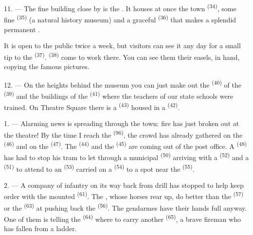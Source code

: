 \VUsaut{4.0mm}
\VUsaut{3.4mm}

11. --- The fine building close by is the . It houses at once the town
 \textsuperscript{(34)}, some fine
 \textsuperscript{(35)} (a natural history
museum) and a graceful  \textsuperscript{(36)} that makes a splendid
permanent .

It is open to the public twice a week, but visitors can see it any day for a small tip to the
 \textsuperscript{(37)}.  \textsuperscript{(38)} come to
work there. You can see them  their easels,  in hand,
copying the famous pictures.

12. --- On the heights behind the museum you can just make out the
 \textsuperscript{(40)} of the  \textsuperscript{(39)} and the
buildings of the  \textsuperscript{(41)} where the teachers
of our state schools were trained. On Theatre Square there is a
 \textsuperscript{(43)} housed in a 
\textsuperscript{(42)}.

\VUsaut{5.0mm}
\VUsaut{3.0mm}

\VUsaut{3.4mm}

1. --- Alarming news is spreading through the town: fire has just broken out at the theatre!
By the time I reach the  \textsuperscript{(96)}, the crowd has already gathered
on the  \textsuperscript{(46)} and on the
 \textsuperscript{(47)}. The  \textsuperscript{(44)} and the
 \textsuperscript{(45)} are coming out of the post office. A
 \textsuperscript{(48)} has had to stop his tram to let through a
municipal  \textsuperscript{(50)} arriving with a 
\textsuperscript{(52)} and a  \textsuperscript{(51)} to attend to an
 \textsuperscript{(53)} carried on a 
\textsuperscript{(54)} to a spot near the  \textsuperscript{(55)}.

2. --- A company of infantry on its way back from drill has stopped to help keep order with
the mounted  \textsuperscript{(61)}. The
, whose horses rear up, do better than the 
\textsuperscript{(57)} or the  \textsuperscript{(63)} at pushing back the
 \textsuperscript{(56)}. The gendarmes have their hands full anyway. One of
them is telling the  \textsuperscript{(64)} where to carry another
 \textsuperscript{(65)}, a brave fireman who has fallen from a ladder.

